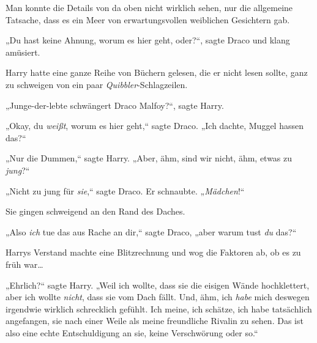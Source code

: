 \later

Man konnte die Details von da oben nicht wirklich sehen, nur die allgemeine Tatsache, dass es ein Meer von erwartungsvollen weiblichen Gesichtern gab.

„Du hast keine Ahnung, worum es hier geht, oder?“, sagte Draco und klang amüsiert.

Harry hatte eine ganze Reihe von Büchern gelesen, die er nicht lesen sollte, ganz zu schweigen von ein paar \emph{Quibbler}-Schlagzeilen.

„Junge-der-lebte schwängert Draco Malfoy?“, sagte Harry.

„Okay, du \emph{weißt}, worum es hier geht,“ sagte Draco. „Ich dachte, Muggel hassen das?“

„Nur die Dummen,“ sagte Harry. „Aber, ähm, sind wir nicht, ähm, etwas zu \emph{jung}?“

„Nicht zu jung für \emph{sie},“ sagte Draco. Er schnaubte. „\emph{Mädchen}!“

Sie gingen schweigend an den Rand des Daches.

„Also \emph{ich} tue das aus Rache an dir,“ sagte Draco, „aber warum tust \emph{du} das?“

Harrys Verstand machte eine Blitzrechnung und wog die Faktoren ab, ob es zu früh war…

„Ehrlich?“ sagte Harry. „Weil ich wollte, dass sie die eisigen Wände hochklettert, aber ich wollte \emph{nicht}, dass sie vom Dach fällt. Und, ähm, ich \emph{habe} mich deswegen irgendwie wirklich schrecklich gefühlt. Ich meine, ich schätze, ich habe tatsächlich angefangen, sie nach einer Weile als meine freundliche Rivalin zu sehen. Das ist also eine echte Entschuldigung an sie, keine Verschwörung oder so.“

